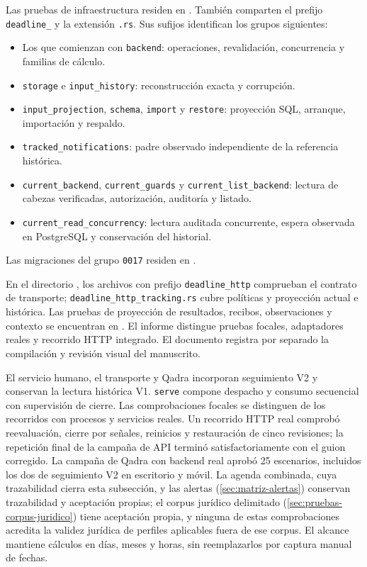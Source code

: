 Las pruebas de infraestructura residen en . También comparten el prefijo \texttt{deadline\_} y la extensión \texttt{.rs}. Sus sufijos identifican los grupos siguientes:
\begin{itemize}
  \item Los que comienzan con \texttt{backend}: operaciones, revalidación, concurrencia y familias de cálculo.
  \item \texttt{storage} e \texttt{input\_history}: reconstrucción exacta y corrupción.
  \item \texttt{input\_projection}, \texttt{schema}, \texttt{import} y \texttt{restore}: proyección SQL, arranque, importación y respaldo.
  \item \texttt{tracked\_notifications}: padre observado independiente de la referencia histórica.
  \item \texttt{current\_backend}, \texttt{current\_guards} y \texttt{current\_list\_backend}: lectura de cabezas verificadas, autorización, auditoría y listado.
  \item \texttt{current\_read\_concurrency}: lectura auditada concurrente, espera observada en PostgreSQL y conservación del historial.
\end{itemize}
Las migraciones del grupo \texttt{0017} residen en .

En el directorio , los archivos con prefijo \texttt{deadline\_http} comprueban el contrato de transporte; \texttt{deadline\_http\_tracking.rs} cubre políticas y proyección actual e histórica. Las pruebas de proyección de resultados, recibos, observaciones y contexto se encuentran en . El informe  distingue pruebas focales, adaptadores reales y recorrido HTTP integrado. El documento  registra por separado la compilación y revisión visual del manuscrito.
\par
\endgroup

El servicio humano, el transporte y Qadra incorporan seguimiento V2 y conservan la lectura histórica V1. \texttt{serve} compone despacho y consumo secuencial con supervisión de cierre. Las comprobaciones focales se distinguen de los recorridos con procesos y servicios reales. Un recorrido HTTP real comprobó reevaluación, cierre por señales, reinicios y restauración de cinco revisiones; la repetición final de la campaña de API terminó satisfactoriamente con el guion corregido. La campaña de Qadra con backend real aprobó 25 escenarios, incluidos los dos de seguimiento V2 en escritorio y móvil. La agenda combinada, cuya trazabilidad cierra esta subsección, y las alertas (\cref{sec:matriz-alertas}) conservan trazabilidad y aceptación propias; el corpus jurídico delimitado (\cref{sec:pruebas-corpus-juridico}) tiene aceptación propia, y ninguna de estas comprobaciones acredita la validez jurídica de perfiles aplicables fuera de ese corpus. El alcance mantiene cálculos en días, meses y horas, sin reemplazarlos por captura manual de fechas.


